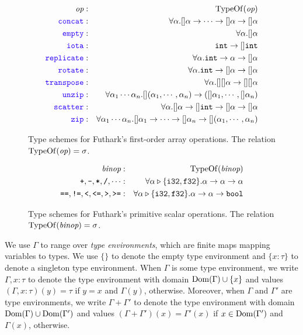 \documentclass[oneside,11pt]{book}
\begin{document}
\begin{figure}
  \begin{eqnarray*}
\id{op} & : & \mathrm{TypeOf}(\id{op}) \\
    \fop{concat} & : & \forall \alpha. []\alpha \rarr \cdots \rarr []\alpha \rarr []\alpha \\
    \fop{empty} & : & \forall \alpha. []\alpha \\
    \fop{iota} & : & \kw{int} \rarr []\kw{int} \\
    \fop{replicate} & : & \forall \alpha. \kw{int} \rarr \alpha \rarr []\alpha\\
    \fop{rotate} & : & \forall \alpha. \kw{int} \rarr []\alpha \rarr []\alpha\\
    \fop{transpose} & : & \forall \alpha. [][]\alpha \rarr [][]\alpha\\
    \fop{unzip} & : & \forall \alpha_1\cdots\alpha_n. [](\alpha_1,\cdots,\alpha_n) \rarr ([]\alpha_1,\cdots,[]\alpha_n) \\
    \fop{scatter} & : & \forall \alpha. []\alpha \rarr []\kw{int} \rarr []\alpha \rarr []\alpha \\
    \fop{zip} & : & \forall \alpha_1\cdots\alpha_n. []\alpha_1\rarr\cdots\rarr[]\alpha_n \rarr [](\alpha_1,\cdots,\alpha_n)
  \end{eqnarray*}
  \caption{Type schemes for Futhark's first-order array operations. The relation $\mathrm{TypeOf}(\mbox{\it{op}}) = \sigma$.}
  \label{fig:foactypeschemes}
\end{figure}

\begin{figure}
  \begin{eqnarray*}
\mbox{\it{binop}} & : & \mathrm{TypeOf}(\mbox{\it{binop}}) \\
    \texttt{+},\texttt{-},\texttt{*},\texttt{/},\cdots & : & \forall \alpha \triangleright \{\texttt{i32},\texttt{f32}\}. \alpha \rightarrow \alpha \rightarrow \alpha \\
    \texttt{==},\texttt{!=},\texttt{<},\texttt{<=},\texttt{>},\texttt{>=} & : & \forall \alpha \triangleright \{\texttt{i32},\texttt{f32}\}. \alpha \rightarrow \alpha \rightarrow \texttt{bool}
  \end{eqnarray*}
  \caption{Type schemes for Futhark's primitive scalar operations. The relation $\mathrm{TypeOf}(\mbox{\it{binop}}) = \sigma$.}
  \label{fig:primtypeschemes}
\end{figure}


We use $\Gamma$ to range over \emph{type environments}, which are
finite maps mapping variables to types. We use $\{\}$ to denote the
empty type environment and $\{x:\tau\}$ to denote a singleton type
environment. When $\Gamma$ is some type environment, we write
$\Gamma,x:\tau$ to denote the type environment with domain
${\rm Dom}(\Gamma) \cup \{x\}$ and values $(\Gamma,x:\tau)(y) = \tau$ if
$y=x$ and $\Gamma(y)$, otherwise. Moreover, when $\Gamma$ and
$\Gamma'$ are type environments, we write $\Gamma + \Gamma'$ to denote
the type environment with domain ${\rm Dom}(\Gamma) \cup {\rm Dom}(\Gamma')$ and
values $(\Gamma + \Gamma')(x) = \Gamma'(x)$ if $x \in {\rm Dom}(\Gamma')$
and $\Gamma(x)$, otherwise.
\end{document}
